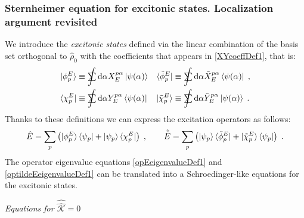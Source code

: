 \documentclass[a4paper]{article}
\newcommand{\dd}{{\rm d}}
\newcommand{\sint}{\mathrlap{\displaystyle\int}
\mathrlap{\textstyle\sum}
\phantom{\mathrlap{\displaystyle
\int}\textstyle\sum}}
\newcommand{\be}{\begin{equation}}
\newcommand{\ee}{\end{equation}}
\newcommand{\nn}{\notag}
\newcommand{\qq}{\qquad}
\newcommand{\lb}{\label}
\newcommand{\op}[1]{\hat {#1}}
\newcommand{\sop}[1]{\op{\op {#1}}}
\newcommand{\tket}[1]{| \tilde #1 \rangle}
\newcommand{\tbra}[1]{\langle \tilde #1 |}
\newcommand{\dmnot}{\op{\rho}_0}
\newcommand{\coupl}{\sop{\mathcal K}}
\begin{document}
\subsubsection{Sternheimer equation for excitonic states. Localization argument revisited}

We introduce the \emph{excitonic states} defined via the linear combination of the basis set orthogonal to $\dmnot$ with the
coefficients that appears in \eqref{XYcoeffDef1}, that is:
\begin{align}\lb{ExcitonicStatesDef1}
\ket{\phi^E_p} &\equiv \sint \dd \alpha X_{E}^{p \alpha} \ket{\psi(\alpha)} &
\tbra{\phi^E_p} &\equiv \sint \dd \alpha {\tilde X_{E}^{p \alpha}} \bra{\psi(\alpha)} \;, \nn\\
\bra{\chi^E_p} &\equiv \sint \dd \alpha  Y_{E}^{p \alpha} \bra{\psi(\alpha)} &
\tket{\chi^E_p} &\equiv \sint \dd \alpha {\tilde Y}_{E}^{p\alpha} \ket{\psi(\alpha)} \;.
\end{align}
Thanks to these definitions we can express the excitation operators as follows:
\be\lb{ExctitationOperatorsDef2}
\op E = \sum_p \left( \ket{\phi^E_p}\bra{\psi_p} + \ket{\psi_p} \bra{\chi^E_p}\right)\;, \qq
\op {\tilde E} = \sum_p \left( \ket{\psi_p} \tbra{\phi^E_p} + \tket{\chi^E_p}\bra{\psi_p} \right)\;.
\ee
The operator eigenvalue equations \eqref{opEeigenvalueDef1} and \eqref{optildeEeigenvalueDef1} can be translated into a Schroedinger-like equations
for the excitonic states. 

\vspace{0.5cm}
\emph{Equations for $\coupl = 0$}
\vspace{0.5cm}
\end{document}
